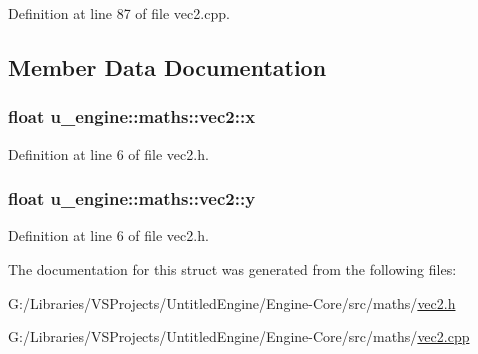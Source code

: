 Definition at line 87 of file vec2.\+cpp.



\subsection{Member Data Documentation}
\hypertarget{structu__engine_1_1maths_1_1vec2_a25400d4a0d4e8bf5a24fd3a3e2073d4a}{}
\subsubsection[{x}]{\setlength{\rightskip}{0pt plus 5cm}float u\+\_\+engine\+::maths\+::vec2\+::x}\label{structu__engine_1_1maths_1_1vec2_a25400d4a0d4e8bf5a24fd3a3e2073d4a}


Definition at line 6 of file vec2.\+h.

\hypertarget{structu__engine_1_1maths_1_1vec2_acf03e4690998267ec3c7b6e957746355}{}
\subsubsection[{y}]{\setlength{\rightskip}{0pt plus 5cm}float u\+\_\+engine\+::maths\+::vec2\+::y}\label{structu__engine_1_1maths_1_1vec2_acf03e4690998267ec3c7b6e957746355}


Definition at line 6 of file vec2.\+h.



The documentation for this struct was generated from the following files\+:\begin{DoxyCompactItemize}
\item 
G\+:/\+Libraries/\+V\+S\+Projects/\+Untitled\+Engine/\+Engine-\/\+Core/src/maths/\hyperlink{vec2_8h}{vec2.\+h}\item 
G\+:/\+Libraries/\+V\+S\+Projects/\+Untitled\+Engine/\+Engine-\/\+Core/src/maths/\hyperlink{vec2_8cpp}{vec2.\+cpp}\end{DoxyCompactItemize}
